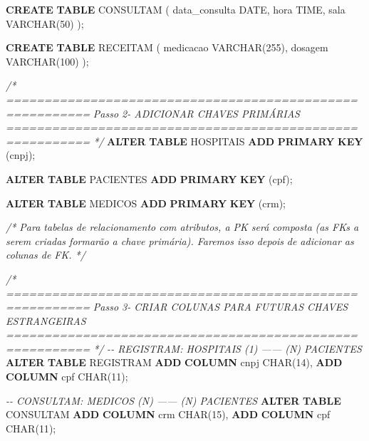 \documentclass[
]{book}
\newenvironment{Shaded}{\begin{snugshade}}{\end{snugshade}}
\newcommand{\CommentTok}[1]{\textcolor[rgb]{0.56,0.35,0.01}{\textit{#1}}}
\newcommand{\DataTypeTok}[1]{\textcolor[rgb]{0.13,0.29,0.53}{#1}}
\newcommand{\DecValTok}[1]{\textcolor[rgb]{0.00,0.00,0.81}{#1}}
\newcommand{\KeywordTok}[1]{\textcolor[rgb]{0.13,0.29,0.53}{\textbf{#1}}}
\newcommand{\NormalTok}[1]{#1}
\begin{document}
\begin{Shaded}
\begin{Highlighting}[]
\KeywordTok{CREATE} \KeywordTok{TABLE}\NormalTok{ CONSULTAM }
\NormalTok{(}
\NormalTok{    data\_consulta   }\DataTypeTok{DATE}\NormalTok{,}
\NormalTok{    hora            }\DataTypeTok{TIME}\NormalTok{,}
\NormalTok{    sala            }\DataTypeTok{VARCHAR}\NormalTok{(}\DecValTok{50}\NormalTok{)}
\NormalTok{);}

\KeywordTok{CREATE} \KeywordTok{TABLE}\NormalTok{ RECEITAM }
\NormalTok{(}
\NormalTok{    medicacao       }\DataTypeTok{VARCHAR}\NormalTok{(}\DecValTok{255}\NormalTok{),}
\NormalTok{    dosagem         }\DataTypeTok{VARCHAR}\NormalTok{(}\DecValTok{100}\NormalTok{)}
\NormalTok{);}

\CommentTok{/* =========================================================}
\CommentTok{   Passo 2{-} ADICIONAR CHAVES PRIMÁRIAS}
\CommentTok{   ========================================================= */}
\KeywordTok{ALTER} \KeywordTok{TABLE}\NormalTok{ HOSPITAIS  }\KeywordTok{ADD} \KeywordTok{PRIMARY} \KeywordTok{KEY}\NormalTok{ (cnpj);}

\KeywordTok{ALTER} \KeywordTok{TABLE}\NormalTok{ PACIENTES  }\KeywordTok{ADD} \KeywordTok{PRIMARY} \KeywordTok{KEY}\NormalTok{ (cpf);}

\KeywordTok{ALTER} \KeywordTok{TABLE}\NormalTok{ MEDICOS    }\KeywordTok{ADD} \KeywordTok{PRIMARY} \KeywordTok{KEY}\NormalTok{ (crm);}

\CommentTok{/* Para tabelas de relacionamento com atributos, a PK será composta}
\CommentTok{   (as FKs a serem criadas formarão a chave primária). Faremos isso depois}
\CommentTok{   de adicionar as colunas de FK. */}

\CommentTok{/* =========================================================}
\CommentTok{   Passo 3{-} CRIAR COLUNAS PARA FUTURAS CHAVES ESTRANGEIRAS}
\CommentTok{   ========================================================= */}
\CommentTok{{-}{-} REGISTRAM: HOSPITAIS (1) —— (N) PACIENTES}
\KeywordTok{ALTER} \KeywordTok{TABLE}\NormalTok{ REGISTRAM }\KeywordTok{ADD} \KeywordTok{COLUMN}\NormalTok{ cnpj }\DataTypeTok{CHAR}\NormalTok{(}\DecValTok{14}\NormalTok{), }\KeywordTok{ADD} \KeywordTok{COLUMN}\NormalTok{ cpf  }\DataTypeTok{CHAR}\NormalTok{(}\DecValTok{11}\NormalTok{);}

\CommentTok{{-}{-} CONSULTAM: MEDICOS (N) —— (N) PACIENTES}
\KeywordTok{ALTER} \KeywordTok{TABLE}\NormalTok{ CONSULTAM }\KeywordTok{ADD} \KeywordTok{COLUMN}\NormalTok{ crm  }\DataTypeTok{CHAR}\NormalTok{(}\DecValTok{15}\NormalTok{), }\KeywordTok{ADD} \KeywordTok{COLUMN}\NormalTok{ cpf  }\DataTypeTok{CHAR}\NormalTok{(}\DecValTok{11}\NormalTok{);}


\end{Highlighting}
\end{Shaded}
\end{document}

